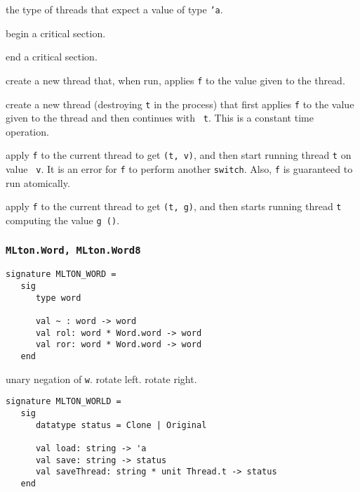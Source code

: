 \begin{description}

the type of threads that expect a value of type {\tt 'a}.

begin a critical section.

end a critical section.

create a new thread that, when run, applies {\tt f} to the
value given to the thread. 

create a new thread (destroying {\tt t} in the process) that first applies
{\tt f} to the value given to the thread and then continues with {\tt
t}.  This is a constant time operation.

apply {\tt f} to the current thread to get
{\tt (t, v)}, and then start running thread {\tt t} on value {\tt
v}.  It is an error for {\tt f} to perform another {\tt switch}.  Also, {\tt f}
is guaranteed to run atomically.

apply {\tt f} to the current thread to get
{\tt (t, g)}, and then starts running thread {\tt t} computing the
value {\tt g ()}.

\end{description}

\subsubsection{\tt MLton.Word, MLton.Word8}
\begin{verbatim}
signature MLTON_WORD =
   sig
      type word
         
      val ~ : word -> word
      val rol: word * Word.word -> word
      val ror: word * Word.word -> word
   end
\end{verbatim}

\begin{description}
unary negation of {\tt w}.
rotate left.
rotate right.
\end{description}

\begin{verbatim}
signature MLTON_WORLD =
   sig
      datatype status = Clone | Original

      val load: string -> 'a
      val save: string -> status
      val saveThread: string * unit Thread.t -> status
   end
\end{verbatim}

